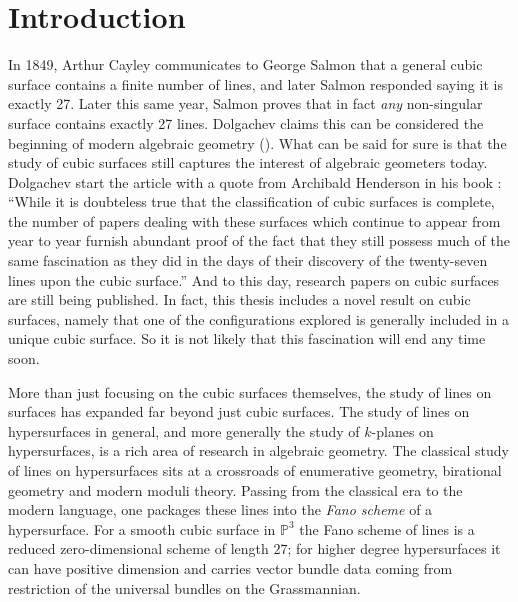 \chapter{Introduction}
\label{intro}


In 1849, Arthur Cayley communicates to George Salmon that a general cubic surface contains a finite number of lines, and later Salmon responded saying it is exactly 27. Later this same year, Salmon proves that in fact \emph{any} non-singular surface contains exactly 27 lines. Dolgachev claims this can be considered the beginning of modern algebraic geometry (\cite{Do04}). What can be said for sure is that the study of cubic surfaces still captures the interest of algebraic geometers today. Dolgachev start the article with a quote from Archibald Henderson in his book \cite{Hen11}: ``While it is doubteless true that the classification of cubic surfaces is complete, the number of papers dealing with these surfaces which continue to appear from year to year furnish abundant proof of the fact that they still possess much of the same fascination as they did in the days of their discovery of the twenty-seven lines upon the cubic surface.'' And to this day, research papers on cubic surfaces are still being published. In fact, this thesis includes a novel result on cubic surfaces, namely that one of the configurations explored is generally included in a unique cubic surface. So it is not likely that this fascination will end any time soon. 

More than just focusing on the cubic surfaces themselves, the study of lines on surfaces has expanded far beyond just cubic surfaces. The study of lines on hypersurfaces in general, and more generally the study of $k$-planes on hypersurfaces, is a rich area of research in algebraic geometry. The classical study of lines on hypersurfaces sits at a crossroads of enumerative geometry, birational geometry and modern moduli theory. Passing from the classical era to the modern language, one packages these lines into the \emph{Fano scheme} of a hypersurface. For a smooth cubic surface in $\mathbb{P}^3$ the Fano scheme of lines is a reduced zero-dimensional scheme of length $27$; for higher degree hypersurfaces it can have positive dimension and carries vector bundle data coming from restriction of the universal bundles on the Grassmannian.

